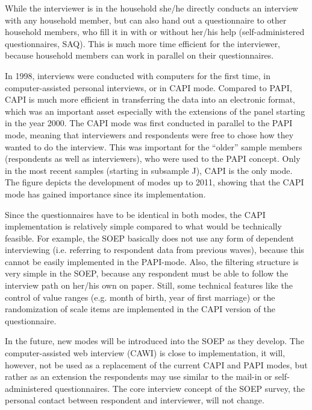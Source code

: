 \documentclass[letterpaper,10pt,openany,onesideH,english]{sphinxmanual}
\begin{document}
While the interviewer is in the household she/he directly conducts an interview with any household member, but can also hand out a questionnaire to other household members, who fill it in with or without her/his help (self-administered questionnaires, SAQ). This is much more time efficient for the interviewer, because household members can work in parallel on their questionnaires.

In 1998, interviews were conducted with computers for the first time, in computer-assisted personal interviews, or in CAPI mode. Compared to PAPI, CAPI is much more efficient in transferring the data into an electronic format, which was an important asset especially with the extensions of the panel starting in the year 2000. The CAPI mode was first conducted in parallel to the PAPI mode, meaning that interviewers and respondents were free to chose how they wanted to do the interview. This was important for the “older” sample members (respondents as well as interviewers), who were used to the PAPI concept. Only in the most recent samples (starting in subsample J), CAPI is the only mode. The figure depicts the development of modes up to 2011, showing that the CAPI mode has gained importance since its implementation.

Since the questionnaires have to be identical in both modes, the CAPI implementation is relatively simple compared to what would be technically feasible. For example, the SOEP basically does not use any form of dependent interviewing (i.e. referring to respondent data from previous waves), because this cannot be easily implemented in the PAPI-mode. Also, the filtering structure is very simple in the SOEP, because any respondent must be able to follow the interview path on her/his own on paper. Still, some technical features like the control of value ranges (e.g. month of birth, year of first marriage) or the randomization of scale items are implemented in the CAPI version of the questionnaire.

In the future, new modes will be introduced into the SOEP as they develop. The computer-assisted web interview (CAWI) is close to implementation, it will, however, not be used as a replacement of the current CAPI and PAPI modes, but rather as an extension the respondents may use similar to the mail-in or self-administered questionnaires. The core interview concept of the SOEP survey, the personal contact between respondent and interviewer, will not change.

\begin{figure}[H]
\centering

\noindent{}
\end{figure}
\end{document}
